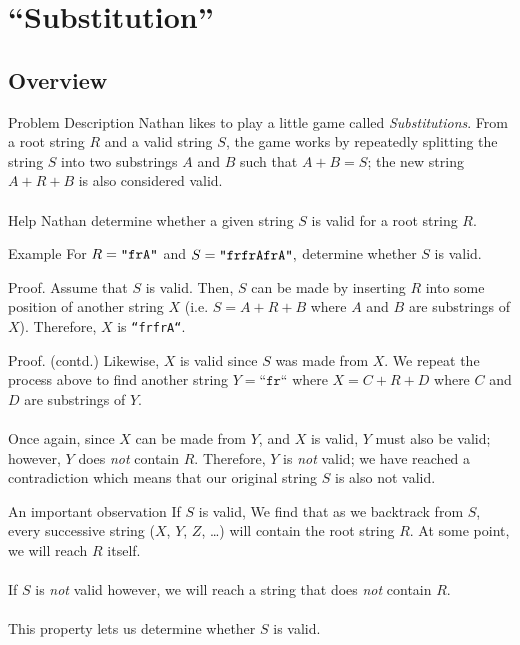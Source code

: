 \documentclass{beamer}
\begin{document}
\section{``Substitution''}
\subsection{Overview}
\begin{frame}{Problem Description}
    Nathan likes to play a little game called \textit{Substitutions}. From a root string $R$ and a valid string $S$, the game works by repeatedly splitting the string $S$ into two substrings $A$ and $B$ such that $A+B=S$; the new string $A+R+B$ is also considered valid.\\~\\
    Help Nathan determine whether a given string $S$ is valid for a root string $R.$
\end{frame}

\begin{frame}[allowframebreaks]{Example}
    For $R=\text{\texttt{``frA''}}$ and $S=\text{\texttt{``frfrAfrA''}},$ determine whether $S$ is valid.
    \begin{block}{Proof.}
    Assume that $S$ is valid. Then, $S$ can be made by inserting $R$ into some position of another string $X$ (i.e. $S=A+R+B$ where $A$ and $B$ are substrings of $X$). Therefore, $X$ is \texttt{``frfrA``}.
    \end{block}
    \framebreak
    \begin{block}{Proof. (contd.)}
    Likewise, $X$ is valid since $S$ was made from $X$. We repeat the process above to find another string $Y=\texttt{``fr``}$ where $X=C+R+D$ where $C$ and $D$ are substrings of $Y$.\\~\\
    Once again, since $X$ can be made from $Y$, and $X$ is valid, $Y$ must also be valid; however, $Y$ does \textit{not} contain $R$. Therefore, $Y$ is \textit{not} valid; we have reached a contradiction which means that our original string $S$ is also not valid.
    \end{block}
\end{frame}

\begin{frame}{An important observation}
    If $S$ is valid, We find that as we backtrack from $S$, every successive string ($X$, $Y$, $Z$, \ldots) will contain the root string $R$. At some point, we will reach $R$ itself.\\~\\
    If $S$ is \textit{not} valid however, we will reach a string that does \textit{not} contain $R$.\\~\\
    This property lets us determine whether $S$ is valid.
\end{frame}
\end{document}

